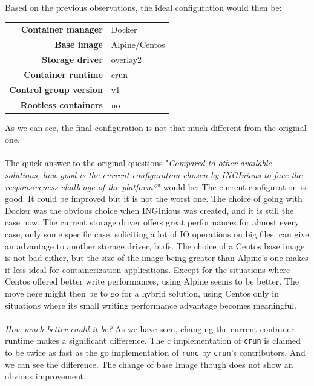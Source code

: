 Based on the previous observations, the ideal configuration would then be:

\begin{center}
\begin{tabular}{rl}
  \textbf{Container manager} & Docker \\
  \textbf{Base image} & Alpine/Centos \\
  \textbf{Storage driver} & overlay2 \\
  \textbf{Container runtime} & crun \\
  \textbf{Control group version} & v1 \\
  \textbf{Rootless containers} & no \\
\end{tabular}
\end{center}

As we can see, the final configuration is not that much different from the original one.  
\paragraph{}The quick answer to the original questions "\textit{Compared to other available solutions, how good is the current configuration chosen by INGInious to face the responsiveness challenge of the platform?}" would be:
The current configuration is good.  It could be improved but it is not the worst one.  The choice of going with Docker was the obvious choice when INGInious was created, and it is still the case now.  The current storage driver offers great performances for almost every case, only some specific case, soliciting a lot of IO operations on big files, can give an advantage to another storage driver, btrfs.  The choice of a Centos base image is not bad either, but the size of the image being greater than Alpine's one makes it less ideal for containerization applications.  Except for the situations where Centos offered better write performances, using Alpine seems to be better.  The move here might then be to go for a hybrid solution, using Centos only in situations where its small writing performance advantage becomes meaningful.  
\paragraph{}\textit{How much better could it be?}  As we have seen, changing the current container runtime makes a significant difference.  The c implementation of \texttt{crun} is claimed to be twice as fast as the go implementation of \texttt{runc} by \texttt{crun}'s contributors.  And we can see the difference.  The change of base Image though does not show an obvious improvement.
